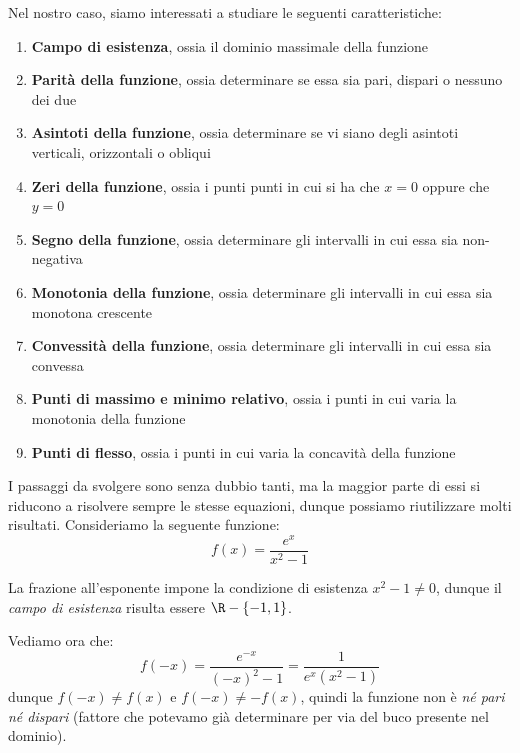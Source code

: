 \documentclass[a4paper, 12pt]{report}
\begin{document}
    Nel nostro caso, siamo interessati a studiare le seguenti caratteristiche:
    \begin{enumerate}
        \item \textbf{Campo di esistenza}, ossia il dominio massimale della funzione
        \item \textbf{Parità della funzione}, ossia determinare se essa sia pari, dispari o nessuno dei due
        \item \textbf{Asintoti della funzione}, ossia determinare se vi siano degli asintoti verticali, orizzontali o obliqui
        \item \textbf{Zeri della funzione}, ossia i punti punti in cui si ha che $x = 0$ oppure che $y = 0$
        \item \textbf{Segno della funzione}, ossia determinare gli intervalli in cui essa sia non-negativa
        \item \textbf{Monotonia della funzione}, ossia determinare gli intervalli in cui essa sia monotona crescente
        \item \textbf{Convessità della funzione}, ossia determinare gli intervalli in cui essa sia convessa
        \item \textbf{Punti di massimo e minimo relativo}, ossia i punti in cui varia la monotonia della funzione
        \item \textbf{Punti di flesso}, ossia i punti in cui varia la concavità della funzione
    \end{enumerate}

    \newpage

    I passaggi da svolgere sono senza dubbio tanti, ma la maggior parte di essi si riducono a risolvere sempre le stesse equazioni, dunque possiamo riutilizzare molti risultati. Consideriamo la seguente funzione:
    \[f(x) = \frac{e^x}{x^2-1}\]

    La frazione all'esponente impone la condizione di esistenza $x^2 -1 \neq 0$, dunque il \textit{campo di esistenza} risulta essere $\R-\{-1, 1\}$.
    
    Vediamo ora che:
    \[f(-x) = \frac{e^{-x}}{(-x)^2-1} = \frac{1}{e^x(x^2-1)}\]
    dunque $f(-x) \neq f(x)$ e $f(-x) \neq -f(x)$, quindi la funzione non è \textit{né pari né dispari} (fattore che potevamo già determinare per via del buco presente nel dominio).
\end{document}
